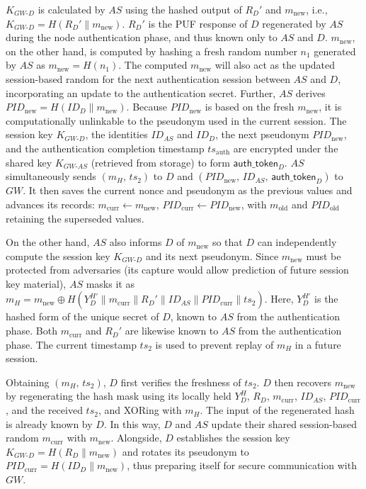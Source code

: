 \documentclass[conference]{IEEEtran}
\begin{document}
$K_{GW\text{-}D}$ is calculated by $AS$ using the hashed output of $R_D'$ and
$m_{\mathrm{new}}$, i.e., $K_{GW\text{-}D} = H(R_D' \| m_{\mathrm{new}})$.
$R_D'$ is the PUF response of $D$ regenerated by $AS$ during the node
authentication phase, and thus known only to $AS$ and $D$.  $m_{\mathrm{new}}$,
on the other hand, is computed by hashing a fresh random number $n_1$ generated
by $AS$ as $m_{\mathrm{new}} = H(n_1)$.  The computed $m_{\mathrm{new}}$ will
also act as the updated session-based random for the next authentication session
between $AS$ and $D$, incorporating an update to the authentication secret.
Further, $AS$ derives $\mathit{PID}_{\mathrm{new}} = H(ID_D \| m_{\mathrm{new}})$.
Because $\mathit{PID}_{\mathrm{new}}$ is based on the fresh $m_{\mathrm{new}}$,
it is computationally unlinkable to the pseudonym used in the current session.
The session key $K_{GW\text{-}D}$, the identities $ID_{AS}$ and $ID_D$, the
next pseudonym $\mathit{PID}_{\mathrm{new}}$, and the authentication completion
timestamp $ts_{\mathrm{auth}}$ are encrypted under the shared key $K_{GW\text{-}AS}$
(retrieved from storage) to form $\mathsf{auth\_token}_D$.  $AS$ simultaneously
sends $(m_H,\, ts_2)$ to $D$ and $(\mathit{PID}_{\mathrm{new}},\, ID_{AS},\, \mathsf{auth\_token}_D)$ to $GW$.
It then saves the current nonce and pseudonym as the previous values and advances
its records: $m_{\mathrm{curr}} \leftarrow m_{\mathrm{new}}$,
$\mathit{PID}_{\mathrm{curr}} \leftarrow \mathit{PID}_{\mathrm{new}}$, with
$m_{\mathrm{old}}$ and $\mathit{PID}_{\mathrm{old}}$ retaining the superseded values.

On the other hand, $AS$ also informs $D$ of $m_{\mathrm{new}}$ so that $D$
can independently compute the session key $K_{GW\text{-}D}$ and its next
pseudonym.  Since $m_{\mathrm{new}}$ must be protected from adversaries (its
capture would allow prediction of future session key material), $AS$ masks it as
$m_H = m_{\mathrm{new}} \oplus H(Y_D^{H'} \| m_{\mathrm{curr}} \| R_D' \| ID_{AS} \| \mathit{PID}_{\mathrm{curr}} \| ts_2)$.
Here, $Y_D^{H'}$ is the hashed form of the unique secret of $D$, known to $AS$
from the authentication phase.  Both $m_{\mathrm{curr}}$ and $R_D'$ are likewise
known to $AS$ from the authentication phase.  The current timestamp $ts_2$ is
used to prevent replay of $m_H$ in a future session.

Obtaining $(m_H,\, ts_2)$, $D$ first verifies the freshness of $ts_2$.  $D$
then recovers $m_{\mathrm{new}}$ by regenerating the hash mask using its locally
held $Y_D^H$, $R_D$, $m_{\mathrm{curr}}$, $ID_{AS}$, $\mathit{PID}_{\mathrm{curr}}$, and the
received $ts_2$, and XORing with $m_H$.  The input of the regenerated hash is
already known by $D$.  In this way, $D$ and $AS$ update their shared
session-based random $m_{\mathrm{curr}}$ with $m_{\mathrm{new}}$.  Alongside,
$D$ establishes the session key $K_{GW\text{-}D} = H(R_D \| m_{\mathrm{new}})$
and rotates its pseudonym to $\mathit{PID}_{\mathrm{curr}} = H(ID_D \| m_{\mathrm{new}})$,
thus preparing itself for secure communication with $GW$.
\end{document}
